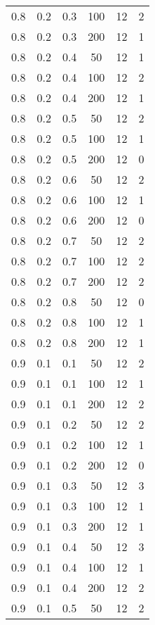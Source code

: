 \begin{center}
\begin{longtable}[c]{|c|c|c|c|c|c|}
	0.8 &  0.2 &  0.3 &  100 &    12 &     2 \\
	0.8 &  0.2 &  0.3 &  200 &    12 &     1 \\
   \hline
	0.8 &  0.2 &  0.4 &   50 &    12 &     1 \\
	0.8 &  0.2 &  0.4 &  100 &    12 &     2 \\
	0.8 &  0.2 &  0.4 &  200 &    12 &     1 \\
   \hline
	0.8 &  0.2 &  0.5 &   50 &    12 &     2 \\
	0.8 &  0.2 &  0.5 &  100 &    12 &     1 \\
	0.8 &  0.2 &  0.5 &  200 &    12 &     0 \\
   \hline
	0.8 &  0.2 &  0.6 &   50 &    12 &     2 \\
	0.8 &  0.2 &  0.6 &  100 &    12 &     1 \\
	0.8 &  0.2 &  0.6 &  200 &    12 &     0 \\
   \hline
	0.8 &  0.2 &  0.7 &   50 &    12 &     2 \\
	0.8 &  0.2 &  0.7 &  100 &    12 &     2 \\
	0.8 &  0.2 &  0.7 &  200 &    12 &     2 \\
   \hline
	0.8 &  0.2 &  0.8 &   50 &    12 &     0 \\
	0.8 &  0.2 &  0.8 &  100 &    12 &     1 \\
	0.8 &  0.2 &  0.8 &  200 &    12 &     1 \\
   \hline
	0.9 &  0.1 &  0.1 &   50 &    12 &     2 \\
	0.9 &  0.1 &  0.1 &  100 &    12 &     1 \\
	0.9 &  0.1 &  0.1 &  200 &    12 &     2 \\
   \hline
	0.9 &  0.1 &  0.2 &   50 &    12 &     2 \\
	0.9 &  0.1 &  0.2 &  100 &    12 &     1 \\
	0.9 &  0.1 &  0.2 &  200 &    12 &     0 \\
   \hline
	0.9 &  0.1 &  0.3 &   50 &    12 &     3 \\
	0.9 &  0.1 &  0.3 &  100 &    12 &     1 \\
	0.9 &  0.1 &  0.3 &  200 &    12 &     1 \\
   \hline
	0.9 &  0.1 &  0.4 &   50 &    12 &     3 \\
	0.9 &  0.1 &  0.4 &  100 &    12 &     1 \\
	0.9 &  0.1 &  0.4 &  200 &    12 &     2 \\
   \hline
	0.9 &  0.1 &  0.5 &   50 &    12 &     2 \\

\end{longtable}
\end{center}
